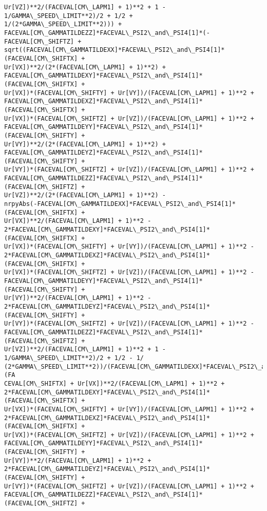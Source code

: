 \documentclass[landscape,letterpaper,10pt,english]{article}
\begin{document}
\begin{Verbatim}[commandchars=\\\{\}]
Ur[VZ])**2/(FACEVAL[CM\_LAPM1] + 1)**2 + 1 - 1/GAMMA\_SPEED\_LIMIT**2)/2 + 1/2 +
1/(2*GAMMA\_SPEED\_LIMIT**2))) +
FACEVAL[CM\_GAMMATILDEZZ]*FACEVAL\_PSI2\_and\_PSI4[1]*(-FACEVAL[CM\_SHIFTZ] +
sqrt((FACEVAL[CM\_GAMMATILDEXX]*FACEVAL\_PSI2\_and\_PSI4[1]*(FACEVAL[CM\_SHIFTX] +
Ur[VX])**2/(2*(FACEVAL[CM\_LAPM1] + 1)**2) +
FACEVAL[CM\_GAMMATILDEXY]*FACEVAL\_PSI2\_and\_PSI4[1]*(FACEVAL[CM\_SHIFTX] +
Ur[VX])*(FACEVAL[CM\_SHIFTY] + Ur[VY])/(FACEVAL[CM\_LAPM1] + 1)**2 +
FACEVAL[CM\_GAMMATILDEXZ]*FACEVAL\_PSI2\_and\_PSI4[1]*(FACEVAL[CM\_SHIFTX] +
Ur[VX])*(FACEVAL[CM\_SHIFTZ] + Ur[VZ])/(FACEVAL[CM\_LAPM1] + 1)**2 +
FACEVAL[CM\_GAMMATILDEYY]*FACEVAL\_PSI2\_and\_PSI4[1]*(FACEVAL[CM\_SHIFTY] +
Ur[VY])**2/(2*(FACEVAL[CM\_LAPM1] + 1)**2) +
FACEVAL[CM\_GAMMATILDEYZ]*FACEVAL\_PSI2\_and\_PSI4[1]*(FACEVAL[CM\_SHIFTY] +
Ur[VY])*(FACEVAL[CM\_SHIFTZ] + Ur[VZ])/(FACEVAL[CM\_LAPM1] + 1)**2 +
FACEVAL[CM\_GAMMATILDEZZ]*FACEVAL\_PSI2\_and\_PSI4[1]*(FACEVAL[CM\_SHIFTZ] +
Ur[VZ])**2/(2*(FACEVAL[CM\_LAPM1] + 1)**2) -
nrpyAbs(-FACEVAL[CM\_GAMMATILDEXX]*FACEVAL\_PSI2\_and\_PSI4[1]*(FACEVAL[CM\_SHIFTX] +
Ur[VX])**2/(FACEVAL[CM\_LAPM1] + 1)**2 -
2*FACEVAL[CM\_GAMMATILDEXY]*FACEVAL\_PSI2\_and\_PSI4[1]*(FACEVAL[CM\_SHIFTX] +
Ur[VX])*(FACEVAL[CM\_SHIFTY] + Ur[VY])/(FACEVAL[CM\_LAPM1] + 1)**2 -
2*FACEVAL[CM\_GAMMATILDEXZ]*FACEVAL\_PSI2\_and\_PSI4[1]*(FACEVAL[CM\_SHIFTX] +
Ur[VX])*(FACEVAL[CM\_SHIFTZ] + Ur[VZ])/(FACEVAL[CM\_LAPM1] + 1)**2 -
FACEVAL[CM\_GAMMATILDEYY]*FACEVAL\_PSI2\_and\_PSI4[1]*(FACEVAL[CM\_SHIFTY] +
Ur[VY])**2/(FACEVAL[CM\_LAPM1] + 1)**2 -
2*FACEVAL[CM\_GAMMATILDEYZ]*FACEVAL\_PSI2\_and\_PSI4[1]*(FACEVAL[CM\_SHIFTY] +
Ur[VY])*(FACEVAL[CM\_SHIFTZ] + Ur[VZ])/(FACEVAL[CM\_LAPM1] + 1)**2 -
FACEVAL[CM\_GAMMATILDEZZ]*FACEVAL\_PSI2\_and\_PSI4[1]*(FACEVAL[CM\_SHIFTZ] +
Ur[VZ])**2/(FACEVAL[CM\_LAPM1] + 1)**2 + 1 - 1/GAMMA\_SPEED\_LIMIT**2)/2 + 1/2 - 1/
(2*GAMMA\_SPEED\_LIMIT**2))/(FACEVAL[CM\_GAMMATILDEXX]*FACEVAL\_PSI2\_and\_PSI4[1]*(FA
CEVAL[CM\_SHIFTX] + Ur[VX])**2/(FACEVAL[CM\_LAPM1] + 1)**2 +
2*FACEVAL[CM\_GAMMATILDEXY]*FACEVAL\_PSI2\_and\_PSI4[1]*(FACEVAL[CM\_SHIFTX] +
Ur[VX])*(FACEVAL[CM\_SHIFTY] + Ur[VY])/(FACEVAL[CM\_LAPM1] + 1)**2 +
2*FACEVAL[CM\_GAMMATILDEXZ]*FACEVAL\_PSI2\_and\_PSI4[1]*(FACEVAL[CM\_SHIFTX] +
Ur[VX])*(FACEVAL[CM\_SHIFTZ] + Ur[VZ])/(FACEVAL[CM\_LAPM1] + 1)**2 +
FACEVAL[CM\_GAMMATILDEYY]*FACEVAL\_PSI2\_and\_PSI4[1]*(FACEVAL[CM\_SHIFTY] +
Ur[VY])**2/(FACEVAL[CM\_LAPM1] + 1)**2 +
2*FACEVAL[CM\_GAMMATILDEYZ]*FACEVAL\_PSI2\_and\_PSI4[1]*(FACEVAL[CM\_SHIFTY] +
Ur[VY])*(FACEVAL[CM\_SHIFTZ] + Ur[VZ])/(FACEVAL[CM\_LAPM1] + 1)**2 +
FACEVAL[CM\_GAMMATILDEZZ]*FACEVAL\_PSI2\_and\_PSI4[1]*(FACEVAL[CM\_SHIFTZ] +

\end{Verbatim}
\end{document}
